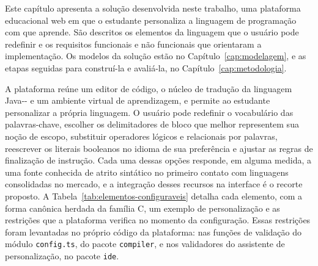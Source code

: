 
Este capítulo apresenta a solução desenvolvida neste trabalho, uma plataforma educacional web em que o estudante personaliza a linguagem de programação com que aprende. São descritos os elementos da linguagem que o usuário pode redefinir e os requisitos funcionais e não funcionais que orientaram a implementação. Os modelos da solução estão no Capítulo~\ref{cap:modelagem}, e as etapas seguidas para construí-la e avaliá-la, no Capítulo~\ref{cap:metodologia}.

A plataforma reúne um editor de código, o núcleo de tradução da linguagem Java-{}- e um ambiente virtual de aprendizagem, e permite ao estudante personalizar a própria linguagem. O usuário pode redefinir o vocabulário das palavras-chave, escolher os delimitadores de bloco que melhor representem sua noção de escopo, substituir operadores lógicos e relacionais por palavras, reescrever os literais booleanos no idioma de sua preferência e ajustar as regras de finalização de instrução. Cada uma dessas opções responde, em alguma medida, a uma fonte conhecida de atrito sintático no primeiro contato com linguagens consolidadas no mercado, e a integração desses recursos na interface é o recorte proposto. A Tabela~\ref{tab:elementos-configuraveis} detalha cada elemento, com a forma canônica herdada da família C, um exemplo de personalização e as restrições que a plataforma verifica no momento da configuração. Essas restrições foram levantadas no próprio código da plataforma: nas funções de validação do módulo \texttt{config.ts}, do pacote \texttt{compiler}, e nos validadores do assistente de personalização, no pacote \texttt{ide}.

